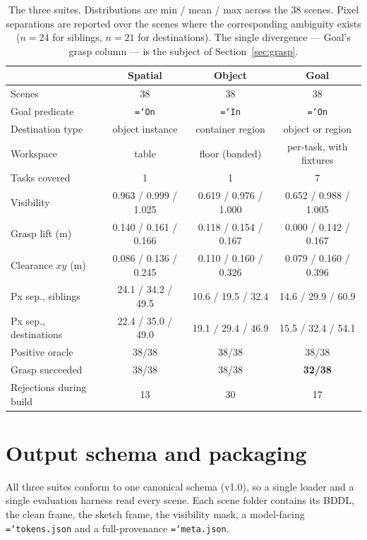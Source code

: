 \documentclass[11pt,a4paper]{article}
\newcommand{\code}[1]{\texttt{\small\hyphenchar\font=`\-\relax #1}}
\begin{document}
\begin{table}[h]
\centering
\small
\begin{tabular}{lccc}
\toprule
 & \textbf{Spatial} & \textbf{Object} & \textbf{Goal} \\
\midrule
Scenes                  & 38 & 38 & 38 \\
Goal predicate          & \code{On} & \code{In} & \code{On} \\
Destination type        & object instance & container region & object or region \\
Workspace               & table & floor (banded) & per-task, with fixtures \\
Tasks covered           & 1 & 1 & 7 \\
\midrule
Visibility              & 0.963 / 0.999 / 1.025 & 0.619 / 0.976 / 1.000 & 0.652 / 0.988 / 1.005 \\
Grasp lift (m)          & 0.140 / 0.161 / 0.166 & 0.118 / 0.154 / 0.167 & 0.000 / 0.142 / 0.167 \\
Clearance $xy$ (m)      & 0.086 / 0.136 / 0.245 & 0.110 / 0.160 / 0.326 & 0.079 / 0.160 / 0.396 \\
Px sep., siblings       & 24.1 / 34.2 / 49.5 & 10.6 / 19.5 / 32.4 & 14.6 / 29.9 / 60.9 \\
Px sep., destinations   & 22.4 / 35.0 / 49.0 & 19.1 / 29.4 / 46.9 & 15.5 / 32.4 / 54.1 \\
\midrule
Positive oracle         & 38/38 & 38/38 & 38/38 \\
Grasp succeeded         & 38/38 & 38/38 & \textbf{32/38} \\
Rejections during build & 13 & 30 & 17 \\
\bottomrule
\end{tabular}
\caption{The three suites. Distributions are min / mean / max across the 38
scenes. Pixel separations are reported over the scenes where the corresponding
ambiguity exists ($n=24$ for siblings, $n=21$ for destinations). The single
divergence --- Goal's grasp column --- is the subject of
Section~\ref{sec:grasp}.}
\label{tab:suites}
\end{table}

\section{Output schema and packaging}

All three suites conform to one canonical schema (v1.0), so a single loader and
a single evaluation harness read every scene. Each scene folder contains its
BDDL, the clean frame, the sketch frame, the visibility mask, a model-facing
\code{tokens.json} and a full-provenance \code{meta.json}.
\end{document}
